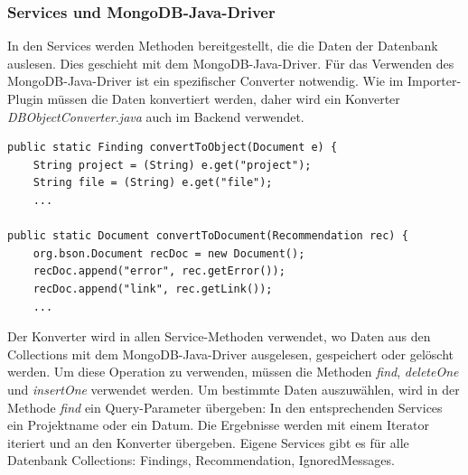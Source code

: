 \subsubsection{Services und MongoDB-Java-Driver}
In den Services werden Methoden bereitgestellt, die die Daten der Datenbank auslesen. Dies geschieht mit dem MongoDB-Java-Driver. Für das Verwenden des MongoDB-Java-Driver ist ein spezifischer Converter notwendig. Wie im Importer-Plugin müssen die Daten konvertiert werden, daher wird ein Konverter \textit{DBObjectConverter.java} auch im Backend verwendet.
\lstset{
  caption={Um die Datenbank benutzen können, müssen die Java-Objekte bzw. die Datenbank-JSON-Objekte konvertiert werden.}, 
  basicstyle=\small\ttfamily, 
  label=lst:main, 
  language=Java,
  frame=single,
  breaklines=true, %
  postbreak=\mbox{\textcolor{red}{$\hookrightarrow$}\space},
}

\begin{samepage}%
	\begin{lstlisting}[float=tbhp]
public static Finding convertToObject(Document e) {
    String project = (String) e.get("project");
    String file = (String) e.get("file");    
    ...

public static Document convertToDocument(Recommendation rec) {
    org.bson.Document recDoc = new Document();
    recDoc.append("error", rec.getError());
    recDoc.append("link", rec.getLink());
    ...
	\end{lstlisting}
\end{samepage}

Der Konverter wird in allen Service-Methoden verwendet, wo Daten aus den Collections mit dem MongoDB-Java-Driver ausgelesen, gespeichert oder gelöscht werden. Um diese Operation zu verwenden, müssen die Methoden \textit{find}, \textit{deleteOne} und \textit{insertOne} verwendet werden. Um bestimmte Daten auszuwählen, wird in der Methode \textit{find} ein Query-Parameter übergeben: In den entsprechenden Services ein Projektname oder ein Datum. Die Ergebnisse werden mit einem Iterator iteriert und an den Konverter übergeben. Eigene Services gibt es für alle Datenbank Collections: Findings, Recommendation, IgnoredMessages.

